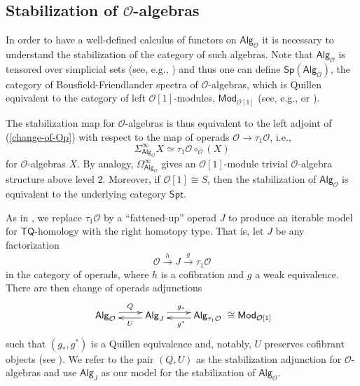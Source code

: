 \documentclass[11pt]{amsart}
\theoremstyle{definition}
\theoremstyle{remark}
\newcommand{\Spt}{\mathsf{Spt}}
\newcommand{\TQ}{\mathsf{TQ}}
\newcommand{\Sp}{\Sigma^{\infty}}
\newcommand{\U}{\Omega^{\infty}}
\newcommand{\Alg}[1]{ {\mathsf{Alg}_{\mathcal{#1}}} }
\newcommand{\Cal}[1]{\mathcal{#1}}
\begin{document}
\subsection{Stabilization of $\Cal{O}$-algebras}
\label{sec:stab}In order to have a well-defined calculus of functors on $\Alg{O}$ it is necessary to understand the stabilization of the category of such algebras. Note that $\Alg{\Cal{O}}$ is tensored over simplicial sets (see, e.g.,  \cite[]{Ching-Harper-Koszul}) and thus one can define $\mathsf{Sp}(\Alg{O})$, the category of Bousfield-Friendlander spectra of $\Cal{O}$-algebras, which is Quillen equivalent to the category of left $\Cal{O}[1]$-modules, $\mathsf{Mod}_{\Cal{O}[1]}$ (see, e.g.,  \cite{Bast-Man} or \cite[]{Per-thesis}). 

The stabilization map for $\Cal{O}$-algebras is thus equivalent to the left adjoint of (\ref{change-of-Op}) with respect to the map of operads $\Cal{O}\to \tau_1\Cal{O}$, i.e., \[\Sp_{\Alg{O}} X\simeq \tau_1\Cal{O} \circ_{\Cal{O}} (X)\] for $\Cal{O}$-algebras $X$. By analogy, $\U_{\Alg{O}}$ gives an $\Cal{O}[1]$-module trivial $\Cal{O}$-algebra structure above level $2$. Moreover, if $\Cal{O}[1]\cong S$, then the stabilization of $\Alg{O}$ is equivalent to the underlying category $\Spt$. 

As in \cite{Ching-Harper-Koszul}, we replace $\tau_1\Cal{O}$ by a ``fattened-up'' operad $J$ to produce an iterable model for $\TQ$-homology with the right homotopy type. That is, let $J$ be any factorization \[\Cal{O}\xrightarrow{\; h\;} J \xrightarrow{\; g \;} \tau_1 \Cal{O}\] in the category of operads, where $h$ is a cofibration and $g$ a weak equivalence. There are then change of operads adjunctions \begin{equation} \label{stab-of-O-alg}
    \xymatrix{
    \Alg{O} \ar@<.75 ex>[r]^{Q} &
    \mathsf{Alg}_{J} \ar@<.5 ex>[l]^{U} \ar@<.75ex>[r]^{g_*} &
    \mathsf{Alg}_{\tau_1\Cal{O}} \ar@<.5ex>[l]^{g^*}
    }  \cong \mathsf{Mod}_{\Cal{O}[1]}
\end{equation}
such that $(g_*,g^*)$ is a Quillen equivalence and, notably, $U$ preserves cofibrant objects (see \cite[5.49]{Har-Hess}). We refer to the pair $(Q,U)$ as the stabilization adjunction for $\Cal{O}$-algebras and use $\mathsf{Alg}_J$ as our model for the stabilization of $\Alg{O}$.
\end{document}
